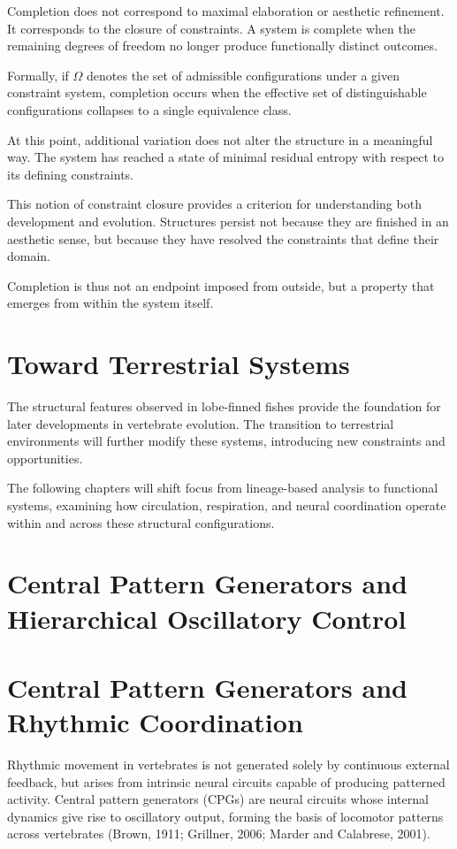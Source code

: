 \documentclass[11pt,oneside]{book}
\begin{document}
Completion does not correspond to maximal elaboration or aesthetic refinement. It corresponds to the closure of constraints. A system is complete when the remaining degrees of freedom no longer produce functionally distinct outcomes.

Formally, if $\Omega$ denotes the set of admissible configurations under a given constraint system, completion occurs when the effective set of distinguishable configurations collapses to a single equivalence class.

At this point, additional variation does not alter the structure in a meaningful way. The system has reached a state of minimal residual entropy with respect to its defining constraints.

This notion of constraint closure provides a criterion for understanding both development and evolution. Structures persist not because they are finished in an aesthetic sense, but because they have resolved the constraints that define their domain.

Completion is thus not an endpoint imposed from outside, but a property that emerges from within the system itself.

\section{Toward Terrestrial Systems}

The structural features observed in lobe-finned fishes provide the foundation for later developments in vertebrate evolution. The transition to terrestrial environments will further modify these systems, introducing new constraints and opportunities.

The following chapters will shift focus from lineage-based analysis to functional systems, examining how circulation, respiration, and neural coordination operate within and across these structural configurations.

\section{Central Pattern Generators and Hierarchical Oscillatory Control}

\section{Central Pattern Generators and Rhythmic Coordination}

Rhythmic movement in vertebrates is not generated solely by continuous external feedback, but arises from intrinsic neural circuits capable of producing patterned activity. Central pattern generators (CPGs) are neural circuits whose internal dynamics give rise to oscillatory output, forming the basis of locomotor patterns across vertebrates (Brown, 1911; Grillner, 2006; Marder and Calabrese, 2001).
\end{document}
